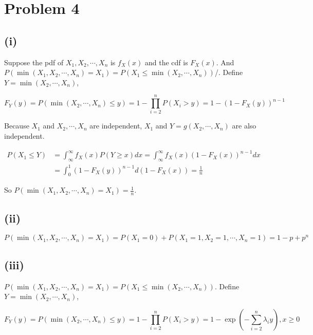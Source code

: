 \documentclass{article}
\begin{document}
\section{Problem 4}

\subsection{(i)}

Suppose the pdf of $X_1,X_2,\cdots,X_n$ is $f_X(x)$ and the cdf is $F_X(x)$. And $P(\min(X_1,X_2,\cdots,X_n)= X_1) = P(X_1\leqslant \min (X_2,\cdots,X_n))$/. Define $Y = \min (X_2,\cdots,X_n)$, 

\begin{equation}
    F_Y(y) = P(\min (X_2,\cdots,X_n) \leqslant y) = 1- \prod_{i=2}^n P(X_i > y ) = 1-(1-F_X(y))^{n-1}
\end{equation}

Because $X_1$ and $X_2,\cdots,X_n$ are independent, $X_1$ and $Y = g(X_2,\cdots,X_n)$ are also independent.

\begin{equation}
    \begin{aligned}
        P(X_1\leqslant Y) & = \int_{\infty}^{\infty}f_X(x) P(Y\geqslant x) dx =  \int_{\infty}^{\infty}f_X(x) (1-F_X(x))^{n-1}  dx \\
        & = \int_{0}^{1}(1-F_X(y))^{n-1} d(1-F_X(x)) = \frac{1}{n}
    \end{aligned}
\end{equation}

So $P(\min(X_1,X_2,\cdots,X_n)= X_1) = \frac{1}{n}$.

\subsection{(ii)}

\begin{equation}
    P(\min(X_1,X_2,\cdots,X_n)= X_1) = P(X_1 =0) + P(X_1=1,X_2 = 1,\cdots,X_n = 1) = 1-p+p^n
\end{equation}

\subsection{(iii)}

$P(\min(X_1,X_2,\cdots,X_n)= X_1) = P(X_1\leqslant \min (X_2,\cdots,X_n))$. Define $Y = \min (X_2,\cdots,X_n)$, 

\begin{equation}
    F_Y(y) = P(\min (X_2,\cdots,X_n) \leqslant y) = 1- \prod_{i=2}^n P(X_i > y ) = 1- \exp(-\sum_{i=2}^n\lambda_i y),x\geqslant 0
\end{equation}
\end{document}
